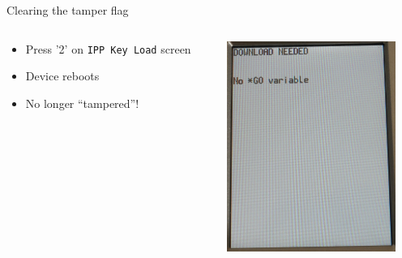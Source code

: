 \documentclass[12pt,aspectratio=169]{beamer}
\begin{document}
\begin{frame}{Clearing the tamper flag}
\begin{columns}
	\begin{column}{0.5\textwidth}
		\begin{itemize}
			\item Press '2' on \texttt{IPP Key Load} screen\pause
			\item Device reboots\pause
			\item No longer ``tampered''!
		\end{itemize}
	\end{column}
	\begin{column}{0.5\textwidth}
		\centering
		\includegraphics[width=5.5cm]{media/lcd_tamper7}
	\end{column}
\end{columns}
\end{frame}

\end{document}
